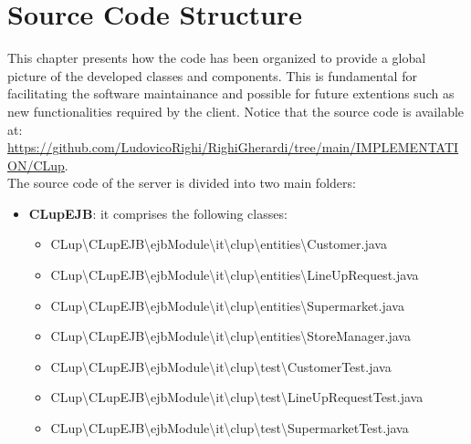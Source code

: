 \chapter{Source Code Structure}
This chapter presents how the code has been organized to provide a global picture of the developed classes and components. This is fundamental for facilitating the software maintainance and possible for future extentions such as new functionalities required by the client. Notice that the source code is available at:\\
 \underline{\href{https://github.com/LudovicoRighi/RighiGherardi/tree/main/IMPLEMENTATION/CLup}{https://github.com/LudovicoRighi/RighiGherardi/tree/main/IMPLEMENTATION/CLup}}.       \\
The source code of the server is divided into two main folders:
\begin{itemize}
	\item \textbf{CLupEJB}: it comprises the following classes:
		\begin{itemize}
							\item CLup\textbackslash CLupEJB\textbackslash ejbModule\textbackslash it\textbackslash clup\textbackslash entities\textbackslash Customer.java
							\item CLup\textbackslash CLupEJB\textbackslash ejbModule\textbackslash it\textbackslash clup\textbackslash entities\textbackslash LineUpRequest.java
							\item CLup\textbackslash CLupEJB\textbackslash ejbModule\textbackslash it\textbackslash clup\textbackslash entities\textbackslash Supermarket.java
							\item CLup\textbackslash CLupEJB\textbackslash ejbModule\textbackslash it\textbackslash clup\textbackslash entities\textbackslash StoreManager.java
							\item CLup\textbackslash CLupEJB\textbackslash ejbModule\textbackslash it\textbackslash clup\textbackslash test\textbackslash CustomerTest.java
							\item CLup\textbackslash CLupEJB\textbackslash ejbModule\textbackslash it\textbackslash clup\textbackslash test\textbackslash LineUpRequestTest.java
							\item CLup\textbackslash CLupEJB\textbackslash ejbModule\textbackslash it\textbackslash clup\textbackslash test\textbackslash SupermarketTest.java
						 

\end{itemize}
\end{itemize}
